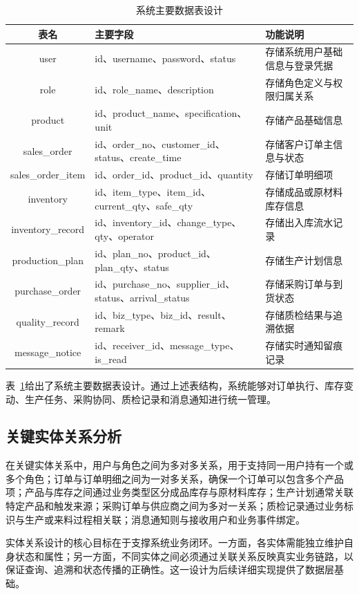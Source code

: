 \begin{table}[htbp]
\centering
\footnotesize
\caption{系统主要数据表设计}
\label{tab:main-tables}
\begin{tabular}{|c|p{4.0cm}|p{6.8cm}|}
\hline
表名 & 主要字段 & 功能说明 \\\hline
user & id、username、password、status & 存储系统用户基础信息与登录凭据 \\\hline
role & id、role\_name、description & 存储角色定义与权限归属关系 \\\hline
product & id、product\_name、specification、unit & 存储产品基础信息 \\\hline
sales\_order & id、order\_no、customer\_id、status、create\_time & 存储客户订单主信息与状态 \\\hline
sales\_order\_item & id、order\_id、product\_id、quantity & 存储订单明细项 \\\hline
inventory & id、item\_type、item\_id、current\_qty、safe\_qty & 存储成品或原材料库存信息 \\\hline
inventory\_record & id、inventory\_id、change\_type、qty、operator & 存储出入库流水记录 \\\hline
production\_plan & id、plan\_no、product\_id、plan\_qty、status & 存储生产计划信息 \\\hline
purchase\_order & id、purchase\_no、supplier\_id、status、arrival\_status & 存储采购订单与到货状态 \\\hline
quality\_record & id、biz\_type、biz\_id、result、remark & 存储质检结果与追溯依据 \\\hline
message\_notice & id、receiver\_id、message\_type、is\_read & 存储实时通知留痕记录 \\\hline
\end{tabular}
\end{table}

表~\ref{tab:main-tables}给出了系统主要数据表设计。通过上述表结构，系统能够对订单执行、库存变动、生产任务、采购协同、质检记录和消息通知进行统一管理。

\subsection{关键实体关系分析}

在关键实体关系中，用户与角色之间为多对多关系，用于支持同一用户持有一个或多个角色；订单与订单明细之间为一对多关系，确保一个订单可以包含多个产品项；产品与库存之间通过业务类型区分成品库存与原材料库存；生产计划通常关联特定产品和触发来源；采购订单与供应商之间为多对一关系；质检记录通过业务标识与生产或来料过程相关联；消息通知则与接收用户和业务事件绑定。

实体关系设计的核心目标在于支撑系统业务闭环。一方面，各实体需能独立维护自身状态和属性；另一方面，不同实体之间必须通过关联关系反映真实业务链路，以保证查询、追溯和状态传播的正确性。这一设计为后续详细实现提供了数据层基础。
